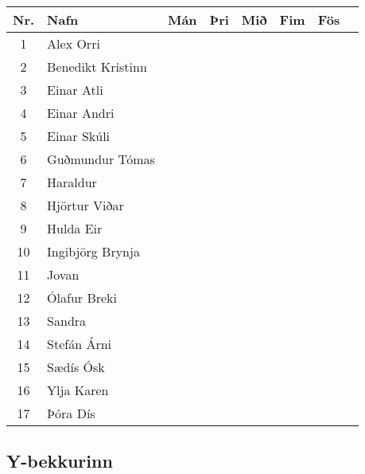 \begin{table}[H]
    \centering
    \begin{tabular}{|c|l|c|c|c|c|c|c|}
    \hline 
    \textbf{Nr.} & \textbf{Nafn} & \textbf{Mán} & \textbf{Þri} & \textbf{Mið} & \textbf{Fim} & \textbf{Fös} \\ \hline \hline
       1 & Alex Orri  & & & & &  \\ \hline
       2 & Benedikt Kristinn & & & & &   \\ \hline
       3 & Einar Atli & & & & &  \\ \hline
       4 & Einar Andri & & & & &  \\ \hline
       5 & Einar Skúli & & & & &  \\ \hline
       6 & Guðmundur Tómas & & & & &  \\ \hline
       7 & Haraldur & & & & &  \\ \hline
       8 & Hjörtur Viðar & & & & &  \\ \hline
       9 & Hulda Eir & & & & &  \\ \hline
       10 & Ingibjörg Brynja & & & & &  \\ \hline
       11 & Jovan & & & & &  \\ \hline
       12 & Ólafur Breki & & & & &  \\ \hline
       13 & Sandra & & & & &  \\ \hline
       14 & Stefán Árni & & & & &  \\ \hline
       15 & Sædís Ósk & & & & & \\ \hline
       16 & Ylja Karen & & & & &  \\ \hline
       17 & Þóra Dís & & & & &  \\ \hline
    \end{tabular}
\end{table}

\newpage

\subsection*{Y-bekkurinn}

